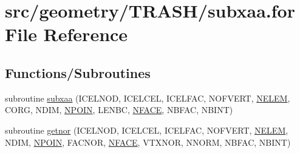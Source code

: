 \hypertarget{subxaa_8for}{\section{src/geometry/\-T\-R\-A\-S\-H/subxaa.for File Reference}
\label{subxaa_8for}
}
\subsection*{Functions/\-Subroutines}
\begin{DoxyCompactItemize}
\item 
subroutine \hyperlink{subxaa_8for_af46ea6a405dc25887cb816ae60b3b30f}{subxaa} (I\-C\-E\-L\-N\-O\-D, I\-C\-E\-L\-C\-E\-L, I\-C\-E\-L\-F\-A\-C, N\-O\-F\-V\-E\-R\-T, \hyperlink{mesh_8com_aee5e75b79d0e815c0603cfbccc618957}{N\-E\-L\-E\-M}, C\-O\-R\-G, N\-D\-I\-M, \hyperlink{mesh_8com_ae28c1572321efcd8715b974d87d20c58}{N\-P\-O\-I\-N}, L\-E\-N\-B\-C, \hyperlink{mesh_8com_a78142d59d4cbb9fedbede16187658dd3}{N\-F\-A\-C\-E}, N\-B\-F\-A\-C, N\-B\-I\-N\-T)
\item 
subroutine \hyperlink{subxaa_8for_aa61f00b3036c86c5485798bf1c82ff53}{getnor} (I\-C\-E\-L\-N\-O\-D, I\-C\-E\-L\-C\-E\-L, I\-C\-E\-L\-F\-A\-C, N\-O\-F\-V\-E\-R\-T, \hyperlink{mesh_8com_aee5e75b79d0e815c0603cfbccc618957}{N\-E\-L\-E\-M}, N\-D\-I\-M, \hyperlink{mesh_8com_ae28c1572321efcd8715b974d87d20c58}{N\-P\-O\-I\-N}, F\-A\-C\-N\-O\-R, \hyperlink{mesh_8com_a78142d59d4cbb9fedbede16187658dd3}{N\-F\-A\-C\-E}, V\-T\-X\-N\-O\-R, N\-N\-O\-R\-M, N\-B\-F\-A\-C, N\-B\-I\-N\-T)
\end{DoxyCompactItemize}


